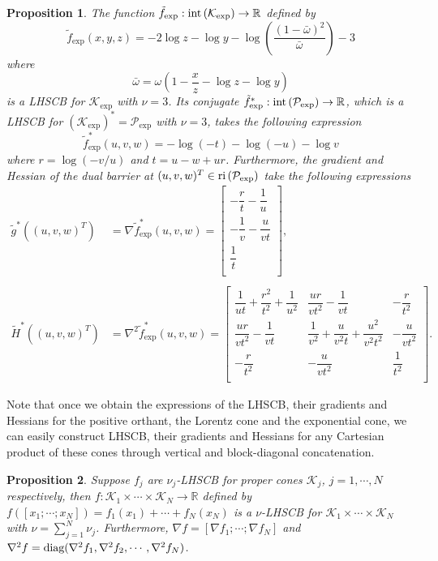 \documentclass[10pt]{article}
\theoremstyle{definition}
\theoremstyle{plain}
\newtheorem{prop}{Proposition}
\def\interior{\protect{\textnormal{ri}}}
\def\diagonal{\protect{\textnormal{diag}}}
\begin{document}
\begin{prop}
	The function $\tilde{f}_{\exp}: \textnormal{int}\left(\mathcal{K}_{\exp}\right)\rightarrow \mathbb{R}$ defined by
	\[\tilde{f}_{\exp}(x,y,z) = -2 \log z - \log y  - \log \left(\dfrac{(1-\bar{\omega})^2}{\bar{\omega}}\right) - 3 \]
	where 
	\[\bar{\omega} = \omega\left(1-\dfrac{x}{z} - \log z - \log y\right) \]
	is a LHSCB for $\mathcal{K}_{\exp}$ with $\nu = 3$. Its conjugate $\tilde{f}_{\exp}^*: \textnormal{int}\left(\mathcal{P}_{\exp}\right) \rightarrow \mathbb{R}$, which is a LHSCB for $\left(\mathcal{K}_{\exp}\right)^* = \mathcal{P}_{\exp}$ with $\nu=3$, takes the following expression 
	\[\tilde{f}_{\exp}^*(u,v,w) = -\log\left(-t\right) - \log (-u) - \log v\]
	where $r = \log \left(-v/u\right)$ and $t=u-w+ur$.  Furthermore, the gradient and Hessian of the dual barrier at $(u,v,w)^T \in \interior\left(\mathcal{P}_{\exp}\right)$ take the following expressions \\
	\begin{align*}
	\tilde{g}^*\left((u,v,w)^T\right) &= \nabla \tilde{f}^*_{\exp}(u,v,w) =  
	\begin{bmatrix}
	-\dfrac{r}{t} - \dfrac{1}{u} \\[2ex]
	-\dfrac{1}{v} - \dfrac{u}{vt} \\[2ex]
	\dfrac{1}{t} \\[1ex]
	\end{bmatrix}, \\ \\
	\tilde{H}^*\left((u,v,w)^T\right) &= \nabla^2 \tilde{f}^*_{\exp}(u,v,w) =  
	\begin{bmatrix}
	\dfrac{1}{ut} + \dfrac{r^2}{t^2}+ \dfrac{1}{u^2} & \dfrac{ur}{vt^2} - \dfrac{1}{vt} & -\dfrac{r}{t^2} \\[2ex]
	\dfrac{ur}{vt^2} - \dfrac{1}{vt}  & \dfrac{1}{v^2}+\dfrac{u}{v^2t} + \dfrac{u^2}{v^2t^2} & -\dfrac{u}{vt^2} \\[2ex]
	-\dfrac{r}{t^2}	& -\dfrac{u}{vt^2} & \dfrac{1}{t^2} \\[1.5ex]
	\end{bmatrix}.
	\end{align*}
\end{prop}
Note that once we obtain the expressions of the LHSCB, their gradients and Hessians for the positive orthant, the Lorentz cone and the exponential cone, we can easily construct LHSCB, their gradients and Hessians for any Cartesian product of these cones through vertical and block-diagonal concatenation.
\begin{prop}
	Suppose $f_j$ are $\nu_j$-LHSCB for proper cones $\mathcal{K}_j$, $j = 1,\cdots, N$ respectively, then $f: \mathcal{K}_1 \times\cdots\times \mathcal{K}_N \rightarrow \mathbb{R}$ defined by $f([x_1;\cdots; x_N]) = f_1(x_1) + \cdots + f_N(x_N)$ is a $\nu$-LHSCB for $\mathcal{K}_1 \times \cdots \times \mathcal{K}_N$ with $\nu = \sum_{j=1}^N\nu_j$. Furthermore, $\nabla f = [\nabla f_1; \cdots; \nabla f_N]$ and $\nabla^2 f = \diagonal(\nabla^2 f_1, \nabla^2 f_2, \cdots, \nabla^2 f_N)$.
\end{prop}
\end{document}
